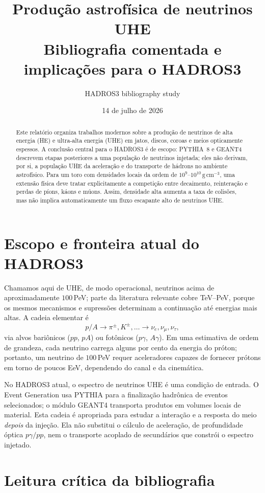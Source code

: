 \documentclass[11pt,a4paper]{article}
\title{Produção astrofísica de neutrinos UHE\\\large Bibliografia comentada e implicações para o HADROS3}
\author{HADROS3 bibliography study}
\date{14 de julho de 2026}
\begin{document}
\maketitle

\begin{abstract}
Este relatório organiza trabalhos modernos sobre a produção de neutrinos de alta energia (HE) e ultra-alta energia (UHE) em jatos, discos, coroas e meios opticamente espessos. A conclusão central para o HADROS3 é de escopo: PYTHIA~8 e GEANT4 descrevem etapas posteriores a uma população de neutrinos injetada; eles não derivam, por si, a população UHE da aceleração e do transporte de hádrons no ambiente astrofísico. Para um toro com densidades locais da ordem de $10^9$--$10^{10}\,\mathrm{g\,cm^{-3}}$, uma extensão física deve tratar explicitamente a competição entre decaimento, reinteração e perdas de píons, káons e múons. Assim, densidade alta aumenta a taxa de colisões, mas não implica automaticamente um fluxo escapante alto de neutrinos UHE.
\end{abstract}

\section{Escopo e fronteira atual do HADROS3}

Chamamos aqui de UHE, de modo operacional, neutrinos acima de aproximadamente $100\,$PeV; parte da literatura relevante cobre TeV--PeV, porque os mesmos mecanismos e supressões determinam a continuação até energias mais altas. A cadeia elementar é
\[
 p/A \longrightarrow \pi^{\pm},K^{\pm},\ldots \longrightarrow \nu_e,\nu_\mu,\nu_\tau,
\]
via alvos bariônicos ($pp$, $pA$) ou fotônicos ($p\gamma$, $A\gamma$). Em uma estimativa de ordem de grandeza, cada neutrino carrega alguns por cento da energia do próton; portanto, um neutrino de $100\,$PeV requer aceleradores capazes de fornecer prótons em torno de poucos EeV, dependendo do canal e da cinemática.

No HADROS3 atual, o espectro de neutrinos UHE é uma condição de entrada. O Event Generation usa PYTHIA para a finalização hadrônica de eventos selecionados; o módulo GEANT4 transporta produtos em volumes locais de material. Esta cadeia é apropriada para estudar a interação e a resposta do meio \emph{depois} da injeção. Ela não substitui o cálculo de aceleração, de profundidade óptica $p\gamma/pp$, nem o transporte acoplado de secundários que constrói o espectro injetado.

\section{Leitura crítica da bibliografia}
\end{document}
